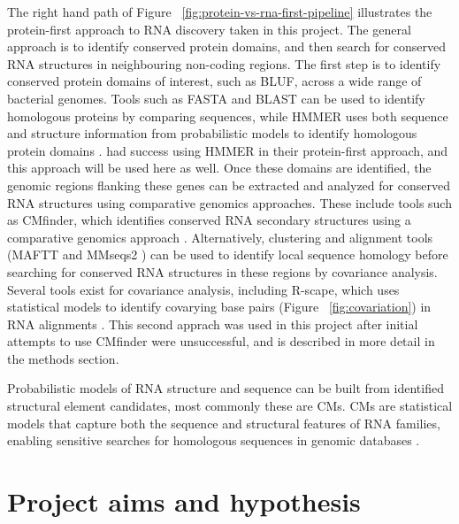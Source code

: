 The right hand path of Figure ~\ref{fig:protein-vs-rna-first-pipeline} illustrates the protein-first approach to RNA discovery taken in this project.
The general approach is to identify conserved protein domains, and then search for conserved RNA structures in neighbouring non-coding regions.
The first step is to identify conserved protein domains of interest, such as \ac{BLUF}, across a wide range of bacterial genomes.
Tools such as FASTA and BLAST can be used to identify homologous proteins by comparing sequences, while HMMER uses both sequence and structure information from probabilistic models to identify homologous protein domains \citep{Pearson2013}.
\citet{Durrant2024} had success using HMMER in their protein-first approach, and this approach will be used here as well.
Once these domains are identified, the genomic regions flanking these genes can be extracted and analyzed for conserved RNA structures using comparative genomics approaches.
These include tools such as CMfinder, which identifies conserved RNA secondary structures using a comparative genomics approach \citep{Yao2006}.
Alternatively, clustering and alignment tools (MAFTT and MMseqs2 \citep{Kallenborn2025, Katoh2013}) can be used to identify local sequence homology before searching for conserved RNA structures in these regions by covariance analysis.
Several tools exist for covariance analysis, including R-scape, which uses statistical models to identify covarying base pairs (Figure ~\ref{fig:covariation}) in RNA alignments \citep{Rivas2017}.
This second apprach was used in this project after initial attempts to use CMfinder were unsuccessful, and is described in more detail in the methods section.

Probabilistic models of RNA structure and sequence can be built from identified structural element candidates, most commonly these are \ac{CM}s.
\ac{CM}s are statistical models that capture both the sequence and structural features of RNA families, enabling sensitive searches for homologous sequences in genomic databases \citep{Nawrocki2013}.

\section{Project aims and hypothesis}

